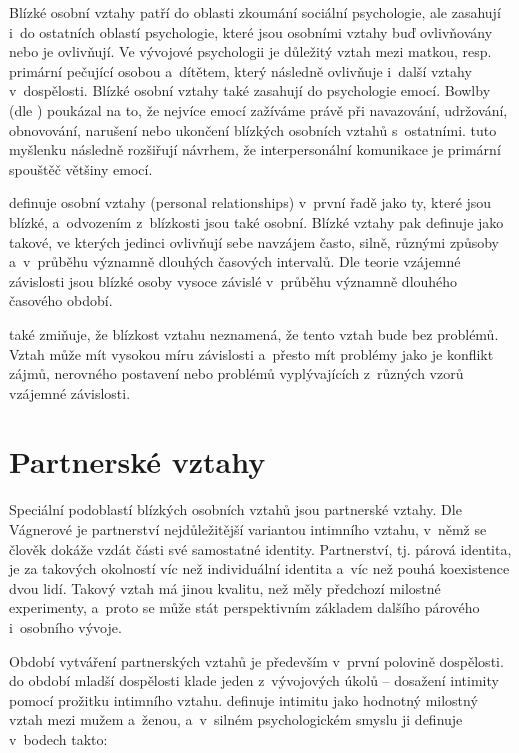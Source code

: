 \documentclass[a4paper, 12pt, notitlepage, oneside, numbers=noenddot]{report}
\begin{document}
Blízké osobní vztahy patří do oblasti zkoumání sociální psychologie,
ale zasahují i~do ostatních oblastí psychologie, které jsou osobními
vztahy buď ovlivňovány nebo je ovlivňují.  Ve vývojové psychologii je
důležitý vztah mezi matkou, resp. primární pečující osobou a~dítětem,
který následně ovlivňuje i~další vztahy v~dospělosti.  Blízké osobní
vztahy také zasahují do psychologie emocí.  Bowlby (dle
\citealp{GuerreroAndersen2000}) poukázal na to, že nejvíce emocí
zažíváme právě při navazování, udržování, obnovování, narušení nebo
ukončení blízkých osobních vztahů s~ostatními.
\citet{GuerreroAndersen2000} tuto myšlenku následně rozšiřují návrhem,
že interpersonální komunikace je primární spouštěč většiny emocí.

\citet{Kelley1986} definuje osobní vztahy (personal relationships)
v~první řadě jako ty, které jsou blízké, a~odvozením z~blízkosti jsou
také osobní.  Blízké vztahy pak definuje jako takové, ve kterých
jedinci ovlivňují sebe navzájem často, silně, různými způsoby
a~v~průběhu významně dlouhých časových intervalů.  Dle teorie vzájemné
závislosti jsou blízké osoby vysoce závislé v~průběhu významně
dlouhého časového období.

\citeauthor{Kelley1986} také zmiňuje, že blízkost vztahu neznamená, že
tento vztah bude bez problémů.  Vztah může mít vysokou míru závislosti
a~přesto mít problémy jako je konflikt zájmů, nerovného postavení nebo
problémů vyplývajících z~různých vzorů vzájemné závislosti.

\section{Partnerské vztahy}
Speciální podoblastí blízkých osobních vztahů jsou partnerské vztahy.
Dle Vágnerové \citeyearpar{Vagnerova2007} je partnerství
nejdůležitější variantou intimního vztahu, v~němž se člověk dokáže
vzdát části své samostatné identity.  Partnerství, tj. párová
identita, je za takových okolností víc než individuální identita a~víc
než pouhá koexistence dvou lidí.  Takový vztah má jinou kvalitu, než
měly předchozí milostné experimenty, a~proto se může stát
perspektivním základem dalšího párového i~osobního vývoje.

Období vytváření partnerských vztahů je především v~první polovině
dospělosti.  \citet{Erikson1999} do období mladší dospělosti klade
jeden z~vývojových úkolů -- dosažení intimity pomocí prožitku
intimního vztahu.  \citet{Rican2006} definuje intimitu jako hodnotný
milostný vztah mezi mužem a~ženou, a~v~silném psychologickém smyslu ji
definuje v~bodech takto:
\end{document}
